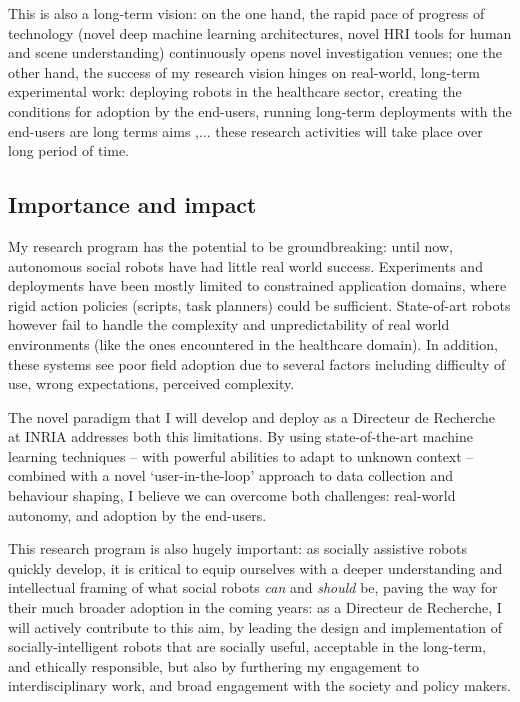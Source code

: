 This is also a long-term vision: on the one hand, the rapid pace of progress
of technology (novel deep machine learning architectures, novel HRI tools for
human and scene understanding) continuously opens novel investigation
venues; one the other hand, the success of my research vision hinges on
real-world, long-term experimental work: deploying robots in the healthcare
sector, creating the conditions for adoption by the end-users, running
long-term deployments with the end-users are long terms aims
,... these research activities will take
place over long period of time.

\subsection{Importance and impact}

My research program has the potential to be groundbreaking: until now,
autonomous social robots have had little real world success. Experiments and
deployments have been mostly limited to constrained application domains, where
rigid action policies (scripts, task planners) could be sufficient. State-of-art
robots however fail to handle the complexity and unpredictability of real world
environments (like the ones encountered in the healthcare domain). In addition,
these systems see poor field adoption due to several factors including
difficulty of use, wrong expectations, perceived complexity.

The novel paradigm that I will develop and deploy as a Directeur de
Recherche at INRIA addresses both this limitations. By using state-of-the-art
machine learning techniques -- with powerful abilities to adapt to unknown context
-- combined with a novel `user-in-the-loop' approach to data collection and
behaviour shaping, I believe we can overcome both challenges: real-world
autonomy, and adoption by the end-users.

This research program is also hugely important: as socially assistive robots quickly
develop, it is critical to equip ourselves with a deeper understanding and
intellectual framing of what social robots \emph{can} and \emph{should} be,
paving the way for their much broader adoption in the coming years: as a
Directeur de Recherche, I will actively contribute to this aim, by leading the
design and implementation of socially-intelligent robots that are socially
useful, acceptable in the long-term, and ethically responsible, but also by
furthering my engagement to interdisciplinary work, and broad engagement with
the society and policy makers.







